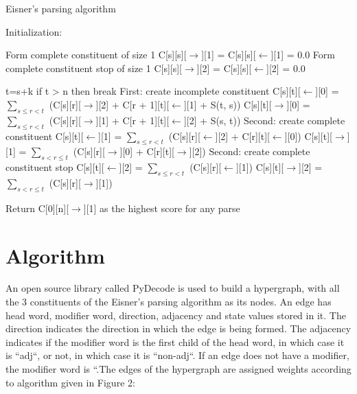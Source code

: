 \documentclass{article}
\begin{document}
\begin{algorithm}

\caption{Eisner's parsing algorithm}
  \label{Figure 1}

\begin{algorithmic}

  \State Initialization:

        Form complete constituent of size 1
        \State C[s][s][$\rightarrow$][1] = C[s][s][$\leftarrow$][1] = 0.0
        Form complete constituent stop of size 1
        \State C[s][s][$\rightarrow$][2] = C[s][s][$\leftarrow$][2] = 0.0
\EndFor




    \State t=s+k
     \State if t > n then break
     \State First: create incomplete constituent
      \State C[s][t][$\leftarrow$][0] = $\sum_{s \le r< t}$ (C[s][r][$\rightarrow$][2] + C[r + 1][t][$\leftarrow$][1] + S(t, s)) 
      \State C[s][t][$\rightarrow$][0] = $\sum_{s \le r<t}$ (C[s][r][$\rightarrow$][1] + C[r + 1][t][$\leftarrow$][2] + S(s, t)) 
      \State Second: create complete constituent
      \State C[s][t][$\leftarrow$][1] = $\sum_{s \le r<t}$ (C[s][r][$\leftarrow$][2] + C[r][t][$\leftarrow$][0])
      \State C[s][t][$\rightarrow$][1] = $\sum_{s<r \le t}$ (C[s][r][$\rightarrow$][0] + C[r][t][$\rightarrow$][2])
      \State Second: create complete constituent stop
      \State C[s][t][$\leftarrow$][2] = $\sum_{s \le r<t}$ (C[s][r][$\leftarrow$][1])
      \State C[s][t][$\rightarrow$][2] = $\sum_{s<r \le t}$ (C[s][r][$\rightarrow$][1])


\EndFor
\EndFor

      \State Return C[0][n][$\rightarrow$][1] as the highest score for any parse

\end{algorithmic}
\end{algorithm}



\section{Algorithm}


An open source library called PyDecode is used to build a hypergraph, with all the 3 constituents of the Eisner's parsing algorithm as its nodes. An edge has head word, modifier word, direction, adjacency and state values stored in it. The direction indicates the direction in which the edge is being formed. The adjacency indicates if the modifier word is the first child of the head word, in which case it is ``adj``, or not, in which case it is ``non-adj``. If an edge does not have a modifier, the modifier word is ``.The edges of the hypergraph are assigned weights according to algorithm given in Figure 2:
\end{document}
